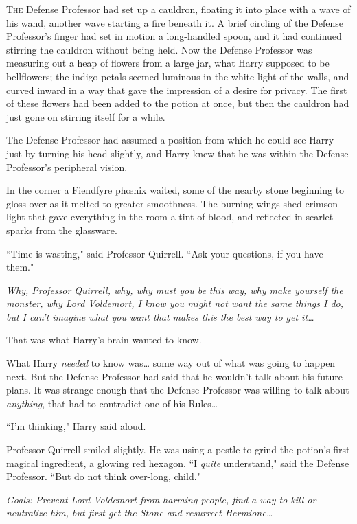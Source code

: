 
\lettrine{T}{he} Defense Professor had set up a cauldron, floating it into place with a wave of his wand, another wave starting a fire beneath it. A brief circling of the Defense Professor's finger had set in motion a long-handled spoon, and it had continued stirring the cauldron without being held. Now the Defense Professor was measuring out a heap of flowers from a large jar, what Harry supposed to be bellflowers; the indigo petals seemed luminous in the white light of the walls, and curved inward in a way that gave the impression of a desire for privacy. The first of these flowers had been added to the potion at once, but then the cauldron had just gone on stirring itself for a while.

The Defense Professor had assumed a position from which he could see Harry just by turning his head slightly, and Harry knew that he was within the Defense Professor's peripheral vision.

In the corner a Fiendfyre phœnix waited, some of the nearby stone beginning to gloss over as it melted to greater smoothness. The burning wings shed crimson light that gave everything in the room a tint of blood, and reflected in scarlet sparks from the glassware.

``Time is wasting," said Professor Quirrell. ``Ask your questions, if you have them."

\emph{Why, Professor Quirrell, why, why must you be this way, why make yourself the monster, why Lord Voldemort, I know you might not want the same things I do, but I can't imagine what you want that makes \emph{this} the best way to get it{\ldots}}

That was what Harry's brain wanted to know.

What Harry \emph{needed} to know was{\ldots} some way out of what was going to happen next. But the Defense Professor had said that he wouldn't talk about his future plans. It was strange enough that the Defense Professor was willing to talk about \emph{anything}, that had to contradict one of his Rules{\ldots}

``I'm thinking," Harry said aloud.

Professor Quirrell smiled slightly. He was using a pestle to grind the potion's first magical ingredient, a glowing red hexagon. ``I \emph{quite} understand," said the Defense Professor. ``But do not think over-long, child."

\emph{Goals: Prevent Lord Voldemort from harming people, find a way to kill or neutralize him, but first get the Stone and resurrect Hermione{\ldots}}

